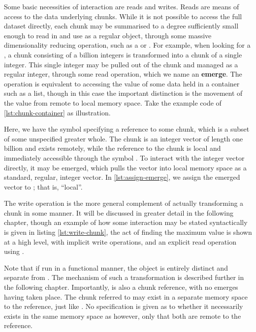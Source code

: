Some basic necessities of interaction are reads and writes.
Reads are means of access to the data underlying chunks.
While it is not possible to access the full dataset directly, each chunk may be summarised to a degree sufficiently small enough to read in and use as a regular object, through some massive dimensionality reducing operation, such as a  or .
For example, when looking for a , a chunk consisting of a billion integers is transformed into a chunk of a single integer.
This single integer may be pulled out of the chunk and managed as a regular integer, through some read operation, which we name an \textbf{emerge}.
The operation is equivalent to accessing the value of some data held in a container such as a list, though in this case the important distinction is the movement of the value from remote to local memory space.
Take the example code of \cref{lst:chunk-container} as illustration.


Here, we have the symbol  specifying a reference to some chunk, which is a subset of some unspecified greater whole.
The chunk is an integer vector of length one billion and exists remotely, while the reference to the chunk is local and immediately accessible through the symbol .
To interact with the integer vector directly, it may be emerged, which pulls the vector into local memory space as a standard, regular, integer vector.
In \cref{lst:assign-emerge}, we assign the emerged vector to ; that is, ``local''.


The write operation is the more general complement of actually transforming a chunk in some manner.
It will be discussed in greater detail in the following chapter, though an example of how some interaction may be stated syntactically is given in listing \cref{lst:write-chunk}, the act of finding the maximum value is shown at a high level, with implicit write operations, and an explicit read operation using .


Note that if run in a functional manner, the object  is entirely distinct and separate from .
The mechanism of such a transformation is described further in the following chapter.
Importantly,  is also a chunk reference, with no emerges having taken place.
The chunk referred to may exist in a separate memory space to the reference, just like .
No specification is given as to whether it necessarily exists in the same memory space as  however, only that both are remote to the reference.

